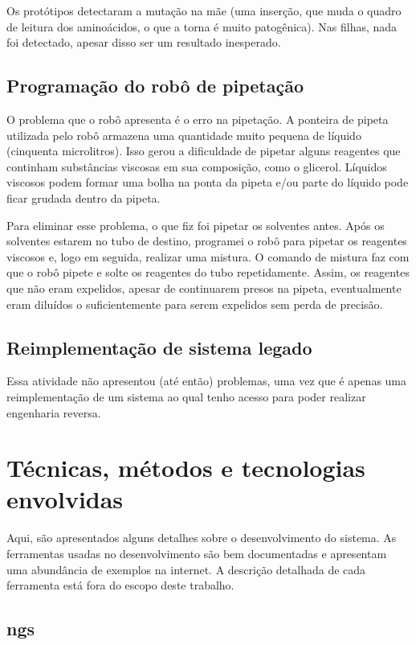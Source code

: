 Os protótipos detectaram a mutação na mãe (uma inserção, que muda o quadro de leitura dos aminoácidos, o que a torna é muito patogênica). Nas filhas, 
nada foi detectado, apesar disso ser um resultado inesperado.

\subsection{Programação do robô de pipetação}

O problema que o robô apresenta é o erro na pipetação. A ponteira de pipeta utilizada pelo robô armazena uma quantidade muito pequena de líquido (cinquenta
microlitros). Isso gerou a dificuldade de pipetar alguns reagentes que continham substâncias viscosas em sua composição, como o glicerol. Líquidos
viscosos podem formar uma bolha na ponta da pipeta e/ou parte do líquido pode ficar grudada dentro da pipeta.

Para eliminar esse problema, o que fiz foi pipetar os solventes antes. Após os solventes estarem no tubo de destino, programei o robô para pipetar os
reagentes viscosos e, logo em seguida, realizar uma mistura. O comando de mistura faz com que o robô pipete e solte os reagentes do tubo repetidamente.
Assim, os reagentes que não eram expelidos, apesar de continuarem presos na pipeta, eventualmente eram diluídos o suficientemente para serem expelidos
sem perda de precisão.

\subsection{Reimplementação de sistema legado}

Essa atividade não apresentou (até então) problemas, uma vez que é apenas uma reimplementação de um sistema ao qual tenho acesso para
poder realizar engenharia reversa.

\section{Técnicas, métodos e tecnologias envolvidas}

Aqui, são apresentados alguns detalhes sobre o desenvolvimento do sistema.
As ferramentas usadas no desenvolvimento são bem documentadas e apresentam uma abundância de
exemplos na internet. A descrição detalhada de cada ferramenta está fora do escopo deste trabalho.

\subsection{\gls{ngs}}

